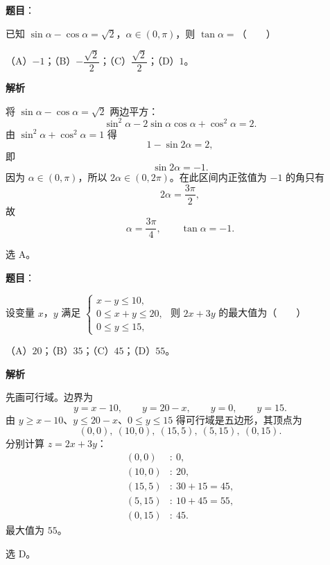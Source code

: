 \begin{answer}

\textbf{题目}：

已知 $\sin\alpha-\cos\alpha=\sqrt2$，$\alpha\in(0,\pi)$，则 $\tan\alpha=$\mbox{（　　）}

（A）$-1$；（B）$-\dfrac{\sqrt2}{2}$；（C）$\dfrac{\sqrt2}{2}$；（D）$1$。

\textbf{解析}

将 $\sin\alpha-\cos\alpha=\sqrt2$ 两边平方：
\nopagebreak[4]
\[\sin^2\alpha-2\sin\alpha\cos\alpha+\cos^2\alpha=2.\]
由 $\sin^2\alpha+\cos^2\alpha=1$ 得
\nopagebreak[4]
\[1-\sin2\alpha=2,\]
即
\nopagebreak[4]
\[\sin2\alpha=-1.\]
因为 $\alpha\in(0,\pi)$，所以 $2\alpha\in(0,2\pi)$。在此区间内正弦值为 $-1$ 的角只有
\nopagebreak[4]
\[2\alpha=\frac{3\pi}{2},\]
故
\nopagebreak[4]
\[\alpha=\frac{3\pi}{4},\qquad \tan\alpha=-1.\]

选 A。


\end{answer}
\begin{answer}

\textbf{题目}：

设变量 $x$，$y$ 满足 $\begin{cases}x-y\leqslant 10,\\0\leqslant x+y\leqslant 20,\\0\leqslant y\leqslant 15,\end{cases}$ 则 $2x+3y$ 的最大值为\mbox{（　　）}

（A）$20$；（B）$35$；（C）$45$；（D）$55$。

\textbf{解析}

先画可行域。边界为
\nopagebreak[4]
\[y=x-10,\qquad y=20-x,\qquad y=0,\qquad y=15.\]
由 $y\geqslant x-10$、$y\leqslant20-x$、$0\leqslant y\leqslant15$ 得可行域是五边形，其顶点为
\nopagebreak[4]
\[(0,0),\ (10,0),\ (15,5),\ (5,15),\ (0,15).\]
分别计算 $z=2x+3y$：
\nopagebreak[4]
\[\begin{aligned}
(0,0)&:\ 0,\\
(10,0)&:\ 20,\\
(15,5)&:\ 30+15=45,\\
(5,15)&:\ 10+45=55,\\
(0,15)&:\ 45.
\end{aligned}\]
最大值为 $55$。

选 D。


\end{answer}
